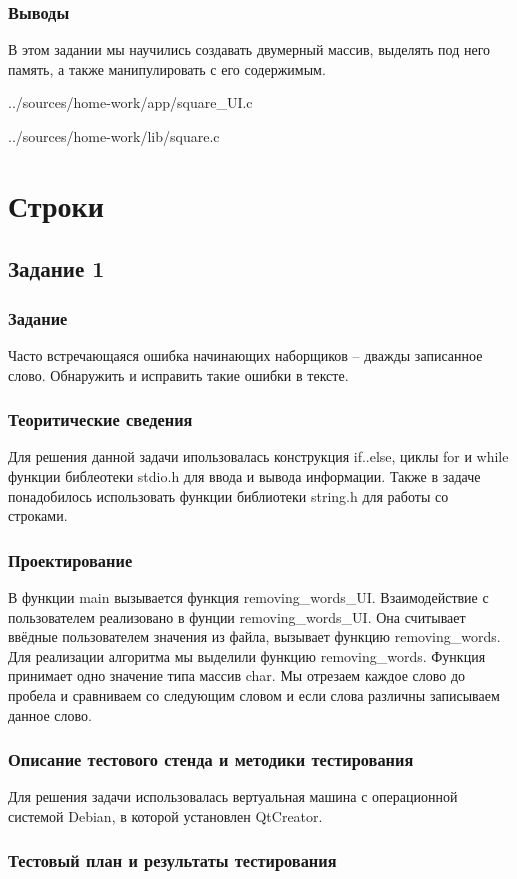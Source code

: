 \documentclass[12pt,a4paper]{report}
\begin{document}
\subsection{Выводы}
В этом задании мы научились создавать двумерный массив, выделять под него память, а также манипулировать с его содержимым.

{../sources/home-work/app/square_UI.c}


{../sources/home-work/lib/square.c}
\chapter{Строки}
\section{Задание 1}
\subsection{Задание}
Часто встречающаяся ошибка начинающих наборщиков – дважды записанное слово. Обнаружить и исправить такие ошибки в тексте.
\subsection{Теоритические сведения}
Для решения данной задачи ипользовалась конструкция if..else, циклы for и while функции библеотеки stdio.h для ввода и вывода информации. Также в задаче понадобилось использовать функции библиотеки string.h для работы со строками.
\subsection{Проектирование}
В функции main вызывается функция removing\_words\_UI. Взаимодействие с пользователем реализовано в фунции removing\_words\_UI. Она считывает ввёдные пользователем значения из файла, вызывает функцию removing\_words. Для реализации алгоритма мы выделили функцию removing\_words. Функция принимает одно значение типа массив char. Мы отрезаем каждое слово до пробела и сравниваем со следующим словом и если слова различны записываем данное слово.
\subsection{Описание тестового стенда и методики тестирования}
Для решения задачи использовалась вертуальная машина с операционной системой Debian, в которой установлен QtCreator. 
\subsection{Тестовый план и результаты тестирования}
\end{document}

